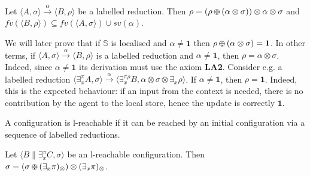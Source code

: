 \documentclass{llncs}
\def\monid{{\mathbf 0}}
\def\odiv{\, {\ominus\hspace{-7.7pt} \div} \,}
\def\monid{\mathbf{1}}
\begin{document}
\begin{lemma}
\label{l-mono}
Let $\langle A, \sigma \rangle \xrightarrow{\alpha} \langle B, \rho \rangle$ be a labelled reduction. 
Then 
$\rho = (\rho \odiv (\alpha \otimes \sigma)) \otimes \alpha \otimes \sigma$ and 
$fv(\langle B, \rho \rangle) \subseteq fv(\langle A, \sigma \rangle) \cup sv(\alpha)$.
\end{lemma}


\begin{remark}
We will later prove that if $\mathbb S$ is localised and $\alpha \neq \monid$ then 
$\rho \odiv (\alpha \otimes \sigma) = \monid$.
In other terms, if $\langle A, \sigma \rangle \xrightarrow{\alpha} \langle B, \rho \rangle$ 
is a labelled reduction and $\alpha \neq \monid$, then $\rho = \alpha \otimes \sigma$.
Indeed, since $\alpha \neq \monid$ its derivation must use the axiom  {\bf LA2}.
%
Consider e.g. a labelled reduction 
$ \langle \exists^\pi_x A, \sigma \rangle \xrightarrow{\alpha}
  \langle \exists^{\pi \rho}_x B, \alpha \otimes \sigma \otimes \exists_x \rho \rangle$.
  If $\alpha \neq \monid$, then $\rho = \monid$. 
  Indeed, this is the expected behaviour: if an input from the context is needed,
  there is no contribution by the agent to the local store, hence the update is 
  correctly $\monid$.
\end{remark}

\begin{definition}
A configuration is l-reachable if it can be
reached by an initial configuration via a sequence of 
labelled reductions.
\end{definition}


\begin{lemma}
\label{l-mono2}
Let 
$\langle B \parallel \exists_x^\pi C, \sigma \rangle$ 
be an l-reachable configuration. 
Then 
$\sigma = (\sigma \odiv (\exists_x \pi)_\otimes) \otimes (\exists_x \pi)_\otimes$.
\end{lemma}
\end{document}
